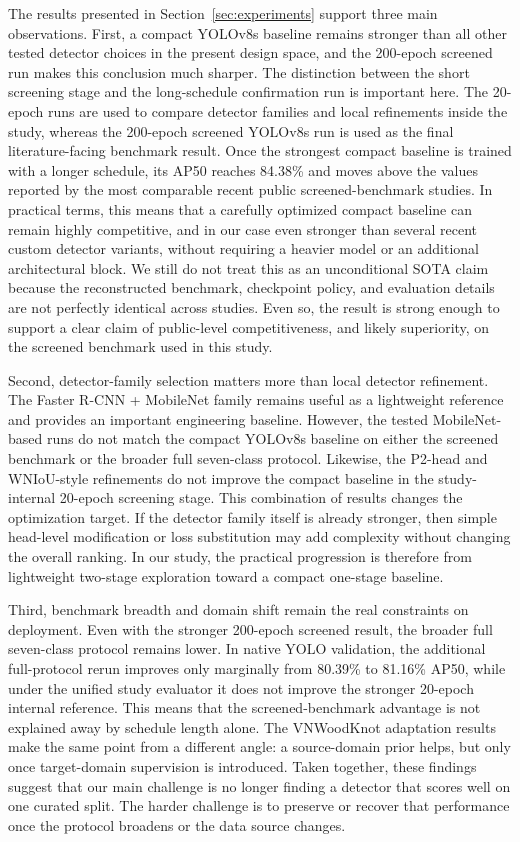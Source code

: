 The results presented in Section~\ref{sec:experiments} support three main observations. First, a compact YOLOv8s baseline remains stronger than all other tested detector choices in the present design space, and the 200-epoch screened run makes this conclusion much sharper. The distinction between the short screening stage and the long-schedule confirmation run is important here. The 20-epoch runs are used to compare detector families and local refinements inside the study, whereas the 200-epoch screened YOLOv8s run is used as the final literature-facing benchmark result. Once the strongest compact baseline is trained with a longer schedule, its AP50 reaches 84.38\% and moves above the values reported by the most comparable recent public screened-benchmark studies. In practical terms, this means that a carefully optimized compact baseline can remain highly competitive, and in our case even stronger than several recent custom detector variants, without requiring a heavier model or an additional architectural block. We still do not treat this as an unconditional SOTA claim because the reconstructed benchmark, checkpoint policy, and evaluation details are not perfectly identical across studies. Even so, the result is strong enough to support a clear claim of public-level competitiveness, and likely superiority, on the screened benchmark used in this study.

Second, detector-family selection matters more than local detector refinement. The Faster R-CNN + MobileNet family remains useful as a lightweight reference and provides an important engineering baseline. However, the tested MobileNet-based runs do not match the compact YOLOv8s baseline on either the screened benchmark or the broader full seven-class protocol. Likewise, the P2-head and WNIoU-style refinements do not improve the compact baseline in the study-internal 20-epoch screening stage. This combination of results changes the optimization target. If the detector family itself is already stronger, then simple head-level modification or loss substitution may add complexity without changing the overall ranking. In our study, the practical progression is therefore from lightweight two-stage exploration toward a compact one-stage baseline.

Third, benchmark breadth and domain shift remain the real constraints on deployment. Even with the stronger 200-epoch screened result, the broader full seven-class protocol remains lower. In native YOLO validation, the additional full-protocol rerun improves only marginally from 80.39\% to 81.16\% AP50, while under the unified study evaluator it does not improve the stronger 20-epoch internal reference. This means that the screened-benchmark advantage is not explained away by schedule length alone. The VNWoodKnot adaptation results make the same point from a different angle: a source-domain prior helps, but only once target-domain supervision is introduced. Taken together, these findings suggest that our main challenge is no longer finding a detector that scores well on one curated split. The harder challenge is to preserve or recover that performance once the protocol broadens or the data source changes.


